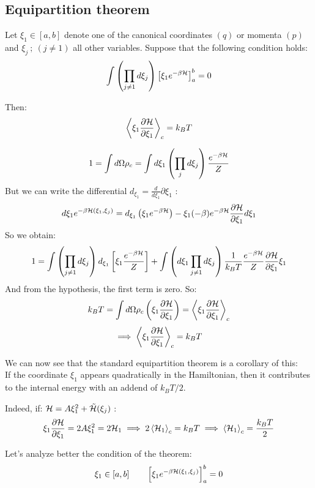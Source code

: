 \subsection{Equipartition theorem}
\Th Let $\xi_1 \in [a,b]$ denote one of the canonical coordinates $(q)$ or momenta $(p)$ and $\xi_j \ ; \ (j\ne 1)$ all other variables. Suppose that the following condition holds:
$$ \int\left(\prod_{j\ne1} d\xi_j\right) \left[\xi_1 e^{-\beta \mathcal{H}}\right]_a^b = 0$$

Then:
$$ \left<\xi_1\frac{\partial\mathcal{H}}{\partial\xi_1}\right>_c = k_BT$$

\Pf 
$$1 = \int d\Omega \rho_c = \int d\xi_1\left(\prod_j d \xi_j\right) \frac{e^{-\beta\mathcal{H}}}Z $$
But we can write the differential $d_{\xi_1} = \frac d{d\xi_1} \partial\xi_1$ :
$$ d\xi_1 e^{-\beta\mathcal{H}(\xi_1,\xi_j)} = d_{\xi_1} \left( \xi_1 e^{-\beta\mathcal{H}}\right) - \xi_1(-\beta) e^{-\beta\mathcal{H}} \frac{\partial\mathcal{H}}{\partial\xi_1} d\xi_1$$
So we obtain:
\begin{align*}
    1 = \int\left(\prod_{j\ne 1} d\xi_j\right) d_{\xi_1} \left[\xi_1 \frac{e^{-\beta\mathcal{H}}}Z\right] + \int \left(d\xi_1 \prod_{j\ne1} d\xi_j\right) \frac 1{k_BT} \frac{e^{-\beta\mathcal{H}}}Z \frac{\partial\mathcal{H}}{\partial\xi_1} \xi_1
\end{align*}
And from the hypothesis, the first term is zero. So:
$$ k_BT = \int d\Omega \rho_c\left(\xi_1\frac{\partial\mathcal{H}}{\partial\xi_1}\right) = \left<\xi_1\frac{\partial\mathcal{H}}{\partial\xi_1}\right>_c$$
$$ \implies \left<\xi_1\frac{\partial\mathcal{H}}{\partial\xi_1}\right>_c = k_BT $$

\EndPf

We can now see that the standard equipartition theorem is a corollary of this: \\
If the coordinate $\xi_1$ appears quadratically in the Hamiltonian, then it contributes to the internal energy with an addend of $k_BT/2$.

Indeed, if: $\mathcal{H} = A\xi_1^2 + \tilde {\mathcal{H}} (\xi_j)$ :
$$\xi_1\frac{\partial\mathcal{H}}{\partial\xi_1} = 2A\xi_1^2 = 2\mathcal{H}_1 \implies 2 \left<\mathcal{H}_1\right>_c = k_BT \implies \left<\mathcal{H}_1\right>_c = \frac{k_BT}2$$

Let's analyze better the condition of the theorem:
$$ \xi_1 \in [a,b] \qquad \left[\xi_1 e^{-\beta\mathcal{H}(\xi_1,\xi_j)}\right]_a^b = 0$$
\begin{wrapfigure}{r}{0.3\textwidth}
    \centering
\end{wrapfigure}

